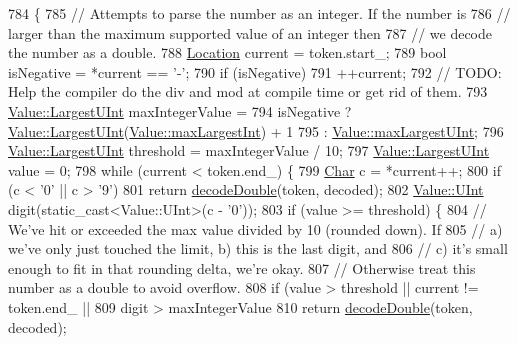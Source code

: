 \begin{DoxyCode}
784                                                       \{
785   \textcolor{comment}{// Attempts to parse the number as an integer. If the number is}
786   \textcolor{comment}{// larger than the maximum supported value of an integer then}
787   \textcolor{comment}{// we decode the number as a double.}
788   \hyperlink{class_json_1_1_reader_a46795b5b272bf79a7730e406cb96375a}{Location} current = token.start\_;
789   \textcolor{keywordtype}{bool} isNegative = *current == \textcolor{charliteral}{'-'};
790   \textcolor{keywordflow}{if} (isNegative)
791     ++current;
792   \textcolor{comment}{// TODO: Help the compiler do the div and mod at compile time or get rid of them.}
793   \hyperlink{class_json_1_1_value_a6682a3684d635e03fc06ba229fa24eec}{Value::LargestUInt} maxIntegerValue =
794       isNegative ? \hyperlink{class_json_1_1_value_a6682a3684d635e03fc06ba229fa24eec}{Value::LargestUInt}(\hyperlink{class_json_1_1_value_a8b4977696f13296fa8755c7953fafb2f}{Value::maxLargestInt}) + 1
795                  : \hyperlink{class_json_1_1_value_a8ddb32d9d55fa5323ae5135639dc2e31}{Value::maxLargestUInt};
796   \hyperlink{class_json_1_1_value_a6682a3684d635e03fc06ba229fa24eec}{Value::LargestUInt} threshold = maxIntegerValue / 10;
797   \hyperlink{class_json_1_1_value_a6682a3684d635e03fc06ba229fa24eec}{Value::LargestUInt} value = 0;
798   \textcolor{keywordflow}{while} (current < token.end\_) \{
799     \hyperlink{class_json_1_1_reader_a3eec9118f3e9a672ba8348c3a79d0f45}{Char} c = *current++;
800     \textcolor{keywordflow}{if} (c < '0' || c > \textcolor{charliteral}{'9'})
801       \textcolor{keywordflow}{return} \hyperlink{class_json_1_1_reader_a2420bbb7fd6d5d3e7e2fea894dd8f70f}{decodeDouble}(token, decoded);
802     \hyperlink{class_json_1_1_value_a0933d59b45793ae4aade1757c322a98d}{Value::UInt} digit(static\_cast<Value::UInt>(c - \textcolor{charliteral}{'0'}));
803     \textcolor{keywordflow}{if} (value >= threshold) \{
804       \textcolor{comment}{// We've hit or exceeded the max value divided by 10 (rounded down). If}
805       \textcolor{comment}{// a) we've only just touched the limit, b) this is the last digit, and}
806       \textcolor{comment}{// c) it's small enough to fit in that rounding delta, we're okay.}
807       \textcolor{comment}{// Otherwise treat this number as a double to avoid overflow.}
808       \textcolor{keywordflow}{if} (value > threshold || current != token.end\_ ||
809           digit > maxIntegerValue %
810         \textcolor{keywordflow}{return} \hyperlink{class_json_1_1_reader_a2420bbb7fd6d5d3e7e2fea894dd8f70f}{decodeDouble}(token, decoded);

\end{DoxyCode}
